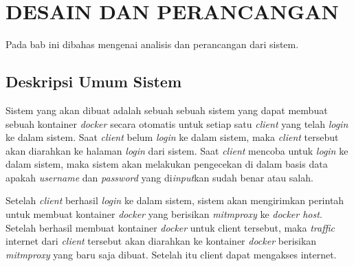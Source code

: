 \chapter{DESAIN DAN PERANCANGAN}
  Pada bab ini dibahas mengenai analisis dan perancangan dari sistem. 
  \section{Deskripsi Umum Sistem}    
    Sistem yang akan dibuat adalah sebuah sebuah sistem yang dapat membuat sebuah kontainer \textit{docker} secara otomatis untuk setiap satu \textit{client} yang telah \textit{login} ke dalam sistem. Saat \textit{client} belum \textit{login} ke dalam sistem, maka \textit{client} tersebut akan diarahkan ke halaman \textit{login} dari sistem. Saat \textit{client} mencoba untuk \textit{login} ke dalam sistem, maka sistem akan melakukan pengecekan di dalam basis data apakah \textit{username} dan \textit{password} yang di\textit{input}kan sudah benar atau salah. 
    
    Setelah \textit{client} berhasil \textit{login} ke dalam sistem, sistem akan mengirimkan perintah untuk membuat kontainer \textit{docker} yang berisikan \textit{mitmproxy} ke \textit{docker host}. Setelah berhasil membuat kontainer \textit{docker} untuk client tersebut, maka \textit{traffic} internet dari \textit{client} tersebut akan diarahkan ke kontainer \textit{docker} berisikan \textit{mitmproxy} yang baru saja dibuat. Setelah itu client dapat mengakses internet.
  
